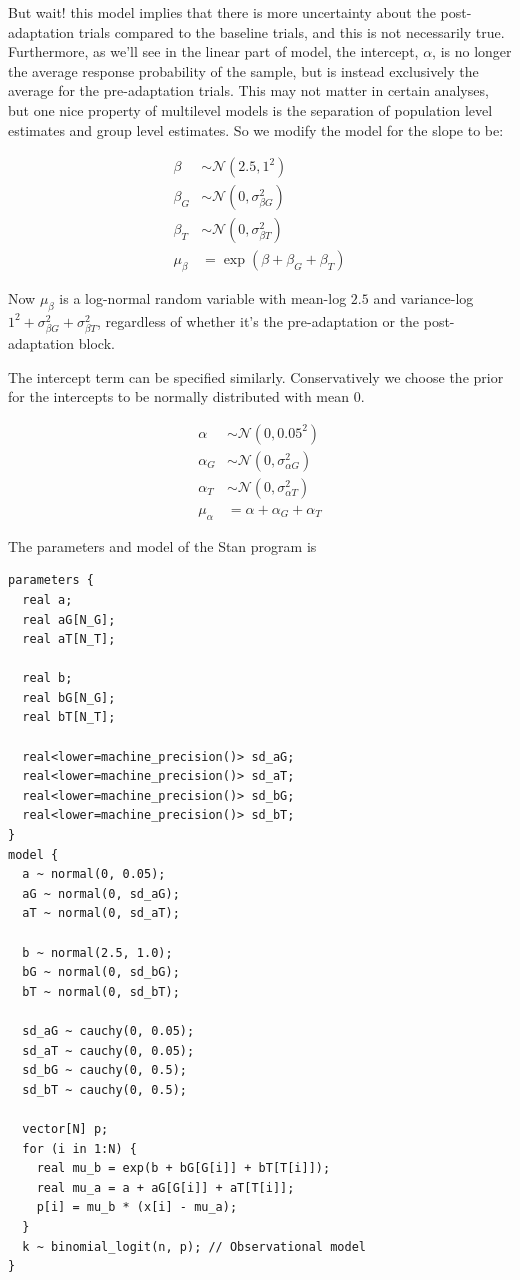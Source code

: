 \documentclass[11pt, oneside, openany]{scrbook}
\begin{document}
But wait! this model implies that there is more uncertainty about the post-adaptation trials compared to the baseline trials, and this is not necessarily true. Furthermore, as we'll see in the linear part of model, the intercept, \(\alpha\), is no longer the average response probability of the sample, but is instead exclusively the average for the pre-adaptation trials. This may not matter in certain analyses, but one nice property of multilevel models is the separation of population level estimates and group level estimates. So we modify the model for the slope to be:

\begin{align*}
\beta &\sim \mathcal{N}(2.5, 1^2) \\
\beta_G &\sim \mathcal{N}(0, \sigma_{\beta G}^2) \\
\beta_T &\sim \mathcal{N}(0, \sigma_{\beta T}^2) \\
\mu_\beta &= \exp(\beta + \beta_G + \beta_T)
\end{align*}

Now \(\mu_\beta\) is a log-normal random variable with mean-log \(2.5\) and variance-log \(1^2 + \sigma_{\beta G}^2 + \sigma_{\beta T}^2\), regardless of whether it's the pre-adaptation or the post-adaptation block.

The intercept term can be specified similarly. Conservatively we choose the prior for the intercepts to be normally distributed with mean 0.

\begin{align*}
\alpha &\sim \mathcal{N}(0, 0.05^2) \\
\alpha_G &\sim \mathcal{N}(0, \sigma_{\alpha G}^2) \\
\alpha_T &\sim \mathcal{N}(0, \sigma_{\alpha T}^2) \\
\mu_\alpha &= \alpha + \alpha_{G} + \alpha_{T}
\end{align*}

The parameters and model of the Stan program is

\begin{verbatim}
parameters {
  real a;
  real aG[N_G];
  real aT[N_T];
  
  real b;
  real bG[N_G];
  real bT[N_T];
  
  real<lower=machine_precision()> sd_aG;
  real<lower=machine_precision()> sd_aT;
  real<lower=machine_precision()> sd_bG;
  real<lower=machine_precision()> sd_bT;
}
model {
  a ~ normal(0, 0.05);
  aG ~ normal(0, sd_aG);
  aT ~ normal(0, sd_aT);
  
  b ~ normal(2.5, 1.0);
  bG ~ normal(0, sd_bG);
  bT ~ normal(0, sd_bT);
  
  sd_aG ~ cauchy(0, 0.05);
  sd_aT ~ cauchy(0, 0.05);
  sd_bG ~ cauchy(0, 0.5);
  sd_bT ~ cauchy(0, 0.5);
  
  vector[N] p;
  for (i in 1:N) {
    real mu_b = exp(b + bG[G[i]] + bT[T[i]]);
    real mu_a = a + aG[G[i]] + aT[T[i]];
    p[i] = mu_b * (x[i] - mu_a);
  }
  k ~ binomial_logit(n, p); // Observational model
}
\end{verbatim}
\end{document}
